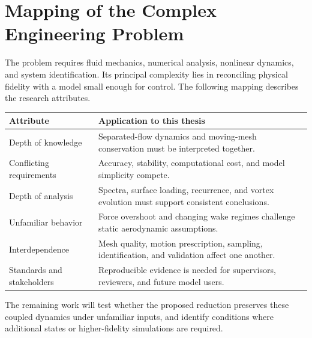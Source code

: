 \section{Mapping of the Complex Engineering Problem}
The problem requires fluid mechanics, numerical analysis, nonlinear dynamics, and system identification. Its principal complexity lies in reconciling physical fidelity with a model small enough for control. The following mapping describes the research attributes.

\begin{center}\small
\begin{tabularx}{\linewidth}{@{}p{.27\linewidth}X@{}}
\toprule
Attribute & Application to this thesis \\
\midrule
Depth of knowledge & Separated-flow dynamics and moving-mesh conservation must be interpreted together. \\
Conflicting requirements & Accuracy, stability, computational cost, and model simplicity compete. \\
Depth of analysis & Spectra, surface loading, recurrence, and vortex evolution must support consistent conclusions. \\
Unfamiliar behavior & Force overshoot and changing wake regimes challenge static aerodynamic assumptions. \\
Interdependence & Mesh quality, motion prescription, sampling, identification, and validation affect one another. \\
Standards and stakeholders & Reproducible evidence is needed for supervisors, reviewers, and future model users. \\
\bottomrule
\end{tabularx}\end{center}

The remaining work will test whether the proposed reduction preserves these coupled dynamics under unfamiliar inputs, and identify conditions where additional states or higher-fidelity simulations are required.


\clearpage
